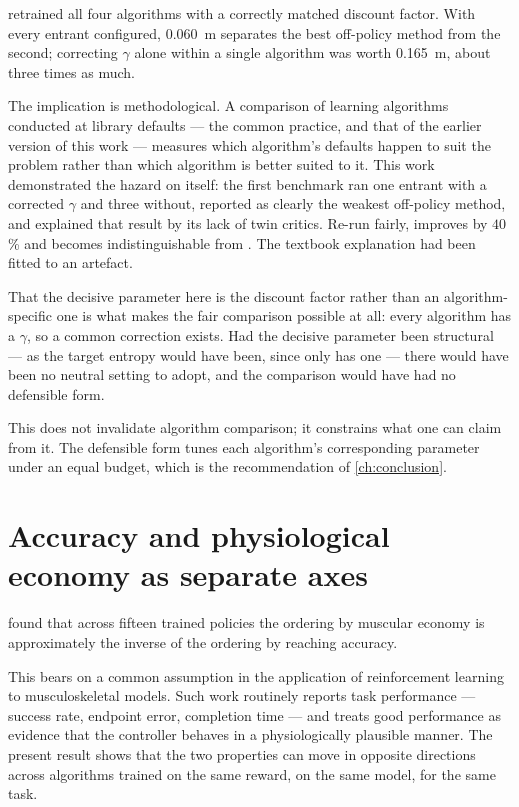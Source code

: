  retrained all four algorithms with a correctly matched
discount factor. With every entrant configured, \SI{0.060}{\meter} separates the
best off-policy method from the second; correcting $\gamma$ alone within a single
algorithm was worth \SI{0.165}{\meter}, about three times as much.

The implication is methodological. A comparison of learning algorithms conducted
at library defaults --- the common practice, and that of the earlier version of
this work --- measures which algorithm's defaults happen to suit the problem
rather than which algorithm is better suited to it. This work demonstrated the
hazard on itself: the first benchmark ran one entrant with a corrected $\gamma$
and three without, reported \DDPG{} as clearly the weakest off-policy method, and
explained that result by its lack of twin critics. Re-run fairly, \DDPG{}
improves by $40$\,\% and becomes indistinguishable from \TDIII. The textbook
explanation had been fitted to an artefact.

That the decisive parameter here is the discount factor rather than an
algorithm-specific one is what makes the fair comparison possible at all: every
algorithm has a $\gamma$, so a common correction exists. Had the decisive
parameter been structural --- as the target entropy would have been, since only
\SAC{} has one --- there would have been no neutral setting to adopt, and the
comparison would have had no defensible form.

This does not invalidate algorithm comparison; it constrains what one can claim
from it. The defensible form tunes each algorithm's corresponding parameter under
an equal budget, which is the recommendation of \cref{ch:conclusion}.

\section{Accuracy and physiological economy as separate axes}

 found that across fifteen trained policies the ordering by
muscular economy is approximately the inverse of the ordering by reaching
accuracy.

This bears on a common assumption in the application of reinforcement learning to
musculoskeletal models. Such work routinely reports task performance --- success
rate, endpoint error, completion time --- and treats good performance as evidence
that the controller behaves in a physiologically plausible manner. The present
result shows that the two properties can move in opposite directions across
algorithms trained on the same reward, on the same model, for the same task.

